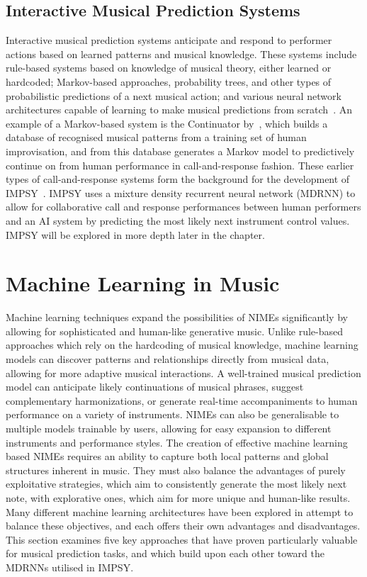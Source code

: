 \subsection{Interactive Musical Prediction Systems}  
Interactive musical prediction systems anticipate and respond to performer actions based on learned patterns and musical knowledge. These systems include rule-based systems based on knowledge of musical theory, either learned or hardcoded; Markov-based approaches, probability trees, and other types of probabilistic predictions of a next musical action; and various neural network architectures capable of learning to make musical predictions from scratch~\citep{Collins2007InteractiveMusic}. An example of a Markov-based system is the Continuator by~\cite{Pachet2002Continuator}, which builds a database of recognised musical patterns from a training set of human improvisation, and from this database generates a Markov model to predictively continue on from human performance in call-and-response fashion. These earlier types of call-and-response systems form the background for the development of IMPSY~\citep{Martin2019IMPSY}. IMPSY uses a mixture density recurrent neural network (MDRNN) to allow for collaborative call and response performances between human performers and an AI system by predicting the most likely next instrument control values. IMPSY will be explored in more depth later in the chapter.

\section{Machine Learning in Music}
Machine learning techniques expand the possibilities of NIMEs significantly by allowing for sophisticated and human-like generative music. Unlike rule-based approaches which rely on the hardcoding of musical knowledge, machine learning models can discover patterns and relationships directly from musical data, allowing for more adaptive musical interactions. A well-trained musical prediction model can anticipate likely continuations of musical phrases, suggest complementary harmonizations, or generate real-time accompaniments to human performance on a variety of instruments. NIMEs can also be generalisable to multiple models trainable by users, allowing for easy expansion to different instruments and performance styles. The creation of effective machine learning based NIMEs requires an ability to capture both local patterns and global structures inherent in music. They must also balance the advantages of purely exploitative strategies, which aim to consistently generate the most likely next note, with explorative ones, which aim for more unique and human-like results. Many different machine learning architectures have been explored in attempt to balance these objectives, and each offers their own advantages and disadvantages. This section examines five key approaches that have proven particularly valuable for musical prediction tasks, and which build upon each other toward the MDRNNs utilised in IMPSY.

